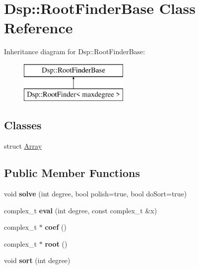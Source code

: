 \hypertarget{classDsp_1_1RootFinderBase}{\section{Dsp\-:\-:Root\-Finder\-Base Class Reference}
\label{classDsp_1_1RootFinderBase}
}
Inheritance diagram for Dsp\-:\-:Root\-Finder\-Base\-:\begin{figure}[H]
\begin{center}
\leavevmode
\includegraphics[height=2.000000cm]{classDsp_1_1RootFinderBase}
\end{center}
\end{figure}
\subsection*{Classes}
\begin{DoxyCompactItemize}
\item 
struct \hyperlink{structDsp_1_1RootFinderBase_1_1Array}{Array}
\end{DoxyCompactItemize}
\subsection*{Public Member Functions}
\begin{DoxyCompactItemize}
\item 
\hypertarget{classDsp_1_1RootFinderBase_a6b5dbe0951cc0e967a42dc6c0b5bdafe}{void {\bfseries solve} (int degree, bool polish=true, bool do\-Sort=true)}\label{classDsp_1_1RootFinderBase_a6b5dbe0951cc0e967a42dc6c0b5bdafe}

\item 
\hypertarget{classDsp_1_1RootFinderBase_ab239084f3f868b79550568eb095498b0}{complex\-\_\-t {\bfseries eval} (int degree, const complex\-\_\-t \&x)}\label{classDsp_1_1RootFinderBase_ab239084f3f868b79550568eb095498b0}

\item 
\hypertarget{classDsp_1_1RootFinderBase_a2422db5de1e2d999388b3619989f4b05}{complex\-\_\-t $\ast$ {\bfseries coef} ()}\label{classDsp_1_1RootFinderBase_a2422db5de1e2d999388b3619989f4b05}

\item 
\hypertarget{classDsp_1_1RootFinderBase_a23ca0c1db1b34907980b20c30833ac72}{complex\-\_\-t $\ast$ {\bfseries root} ()}\label{classDsp_1_1RootFinderBase_a23ca0c1db1b34907980b20c30833ac72}

\item 
\hypertarget{classDsp_1_1RootFinderBase_af340bc0150e715c82f4df8ed4a0e0009}{void {\bfseries sort} (int degree)}\label{classDsp_1_1RootFinderBase_af340bc0150e715c82f4df8ed4a0e0009}

\end{DoxyCompactItemize}
